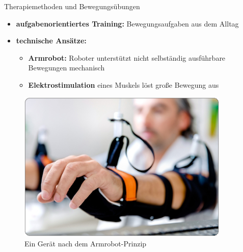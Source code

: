 \documentclass[final,20pt]{beamer}
\newlength{\sepwidth}
\newlength{\colwidth}
\newcommand{\separatorcolumn}{\begin{column}{\sepwidth}\end{column}}
\begin{document}
\begin{frame}[t]
\begin{columns}[t]
\begin{column}{\colwidth}
\begin{alertblock}{Therapiemethoden und Bewegungsübungen}
\begin{itemize}
 	\begin{itemize}
 		\item \textbf{Arm-Basis-Training:} Beübung aller Bewegungsmöglichkeiten des Arms
 		\item \textbf{Arm-Fähigkeits-Training:} Schulung verschiedener Formen von Geschicklichkeit
 	\end{itemize}
	 \item \textbf{aufgabenorientiertes Training:} Bewegungsaufgaben aus dem Alltag
 	\item \textbf{technische Ansätze:}
 	\begin{itemize}
 		\item \textbf{Armrobot:} Roboter unterstützt nicht selbständig ausführbare Bewegungen mechanisch
 		\item \textbf{Elektrostimulation} eines Muskels löst große Bewegung aus
 	\end{itemize}
    \end{itemize}

	\begin{figure}[H]
		\centering
		\includegraphics[width=0.5\colwidth]{pics/einleit1}
		\caption{Ein Gerät nach dem Armrobot-Prinzip}
		\label{fig:armrobot}
	\end{figure}

  \end{alertblock}

\end{column}

\separatorcolumn

\begin{column}{\colwidth}  
	

\end{column}
\end{columns}
\end{frame}
\end{document}
